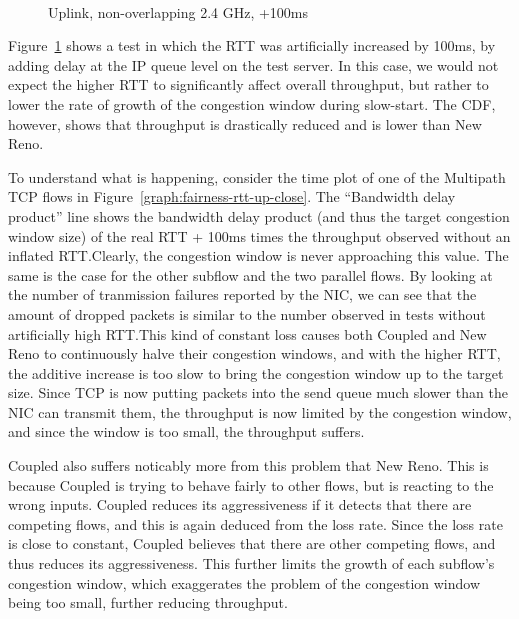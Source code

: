 \begin{figure}[h]
 \centering
 \subfloat[][CDF] {\
   \label{graph:fairness-rtt-up-cdf}
 }
 \\
 \subfloat[][Multipath TCP time plot] {\
   \label{graph:fairness-rtt-up-close}
 }
 \caption{Uplink, non-overlapping 2.4 GHz, +100ms}\label{graph:fairness-rtt-up}
\end{figure}

Figure~\ref{graph:fairness-rtt-up} shows a test in which the RTT was
artificially increased by 100ms, by adding delay at the IP queue level on the
test server. In this case, we would not expect the higher RTT to significantly
affect overall throughput, but rather to lower the rate of growth of the
congestion window during slow-start. The CDF, however, shows that throughput is
drastically reduced and is lower than New Reno.

To understand what is happening, consider the time plot of one of the Multipath
TCP flows in Figure~\ref{graph:fairness-rtt-up-close}. The ``Bandwidth delay
product'' line shows the bandwidth delay product (and thus the target congestion
window size) of the real RTT + 100ms times the throughput observed without an
inflated RTT.\@ Clearly, the congestion window is never approaching this value.
The same is the case for the other subflow and the two parallel flows. By
looking at the number of tranmission failures reported by the NIC, we can see
that the amount of dropped packets is similar to the number observed in tests
without artificially high RTT.\@ This kind of constant loss causes both Coupled
and New Reno to continuously halve their congestion windows, and with the higher
RTT, the additive increase is too slow to bring the congestion window up to the
target size. Since TCP is now putting packets into the send queue much slower
than the NIC can transmit them, the throughput is now limited by the congestion
window, and since the window is too small, the throughput suffers.

Coupled also suffers noticably more from this problem that New Reno. This is
because Coupled is trying to behave fairly to other flows, but is reacting to
the wrong inputs.  Coupled reduces its aggressiveness if it detects that there
are competing flows, and this is again deduced from the loss rate. Since the
loss rate is close to constant, Coupled believes that there are other competing
flows, and thus reduces its aggressiveness. This further limits the growth of
each subflow's congestion window, which exaggerates the problem of the
congestion window being too small, further reducing throughput.

